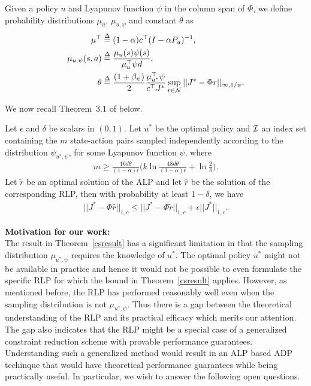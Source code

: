\begin{definition}\label{sampdist}
Given a policy $u$ and Lyapunov function $\psi$ in the column span of $\Phi$, we define probability distributions $\mu_u$, $\mu_{u,\psi}$ and constant $\theta$ as 
\begin{align}
\mu^\top&\stackrel{\Delta}{=}(1-\alpha)c^\top (I-\alpha P_u)^{-1},\nonumber\\
\mu_{u,\psi}(s,a)&\stackrel{\Delta}{=}\frac{\mu_{u}(s) \psi(s)}{\mu_u^\top \psi d},\nonumber\\
\theta&\stackrel{\Delta}{=}\frac{(1+\beta_{\psi})}{2}\frac{\mu_{u^*}^\top \psi}{c^\top J^*}\sup_{r\in \mathcal{N}}||J^*-\Phi r||_{\infty,1/\psi}.
\end{align}
\end{definition}
We now recall Theorem~$3.1$ of \cite{CS} below.
\begin{theorem}\label{csresult}
Let $\epsilon$ and $\delta$ be scalars in $(0,1)$. Let $u^*$ be the optimal policy and $\mathcal{I}$ an index set containing the $m$ state-action pairs sampled independently according to the distribution $\psi_{u^*,\psi}$, for some Lyapunov function $\psi$, where
\begin{align}
m\geq \frac{16d\theta}{(1-\alpha)\epsilon}\big(k\ln\frac{48d\theta}{(1-\alpha)\epsilon}+\ln\frac{2}{\delta}\big).
\end{align}
Let $\tilde{r}$ be an optimal	solution of the ALP and let $\hat{r}$ be the solution of the corresponding RLP, then with probability at least $1-\delta$, we have
\begin{align}
||J^*-\Phi \hat{r}||_{1,c}\leq ||J^*-\Phi \tilde{r}||_{1,c}+\epsilon||J^*||_{1,c}.
\end{align}
\end{theorem}
\textbf{Motivation for our work:}\\
The result in Theorem~\ref{csresult} has a significant limitation in that the sampling distribution $\mu_{u^*,\psi}$ requires the knowledge of $u^*$. The optimal policy $u^*$ might not be available in practice and hence it would not be possible to even formulate the specific RLP for which the bound in Theorem~\ref{csresult} applies. However, as mentioned before, the RLP has performed reasonably well even when the sampling distribution is not $\mu_{u^*,\psi}$. Thus there is a gap between the theoretical understanding of the RLP and its practical efficacy which merits our attention. The gap also indicates that the RLP might be a special case of a generalized constraint reduction scheme with provable performance guarantees. Understanding such a generalized method would result in an ALP based ADP techinque that would have theoretical performance guarantees while being practically useful. In particular, we wish to answer the following open questions.
